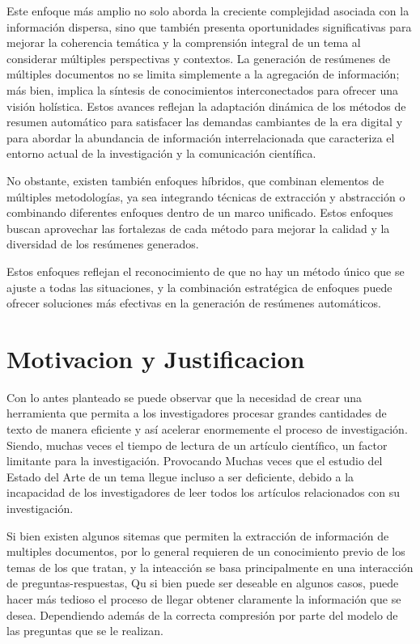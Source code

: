     Este enfoque más amplio no solo aborda la creciente complejidad asociada con la información dispersa, sino que también presenta oportunidades significativas para mejorar la coherencia temática y la comprensión integral de un tema al considerar múltiples perspectivas y contextos. La generación de resúmenes de múltiples documentos no se limita simplemente a la agregación de información; más bien, implica la síntesis de conocimientos interconectados para ofrecer una visión holística. Estos avances reflejan la adaptación dinámica de los métodos de resumen automático para satisfacer las demandas cambiantes de la era digital y para abordar la abundancia de información interrelacionada que caracteriza el entorno actual de la investigación y la comunicación científica.

    No obstante, existen también enfoques híbridos, que combinan elementos de múltiples metodologías, ya sea integrando técnicas de extracción y abstracción o combinando diferentes enfoques dentro de un marco unificado. Estos enfoques buscan aprovechar las fortalezas de cada método para mejorar la calidad y la diversidad de los resúmenes generados.
    
    Estos enfoques reflejan el reconocimiento de que no hay un método único que se ajuste a todas las situaciones, y la combinación estratégica de enfoques puede ofrecer soluciones más efectivas en la generación de resúmenes automáticos.



\section{Motivacion y Justificacion}

    Con lo antes planteado se puede observar que la necesidad de crear una herramienta que permita a los investigadores procesar grandes cantidades de texto de manera eficiente y así acelerar enormemente el proceso de investigación. Siendo, muchas veces el tiempo de lectura de un artículo científico, un factor limitante para la investigación. Provocando Muchas veces que el estudio del Estado del Arte de un tema llegue incluso a ser deficiente, debido a la incapacidad de los investigadores de leer todos los artículos relacionados con su investigación.

    Si bien existen algunos sitemas que permiten la extracción de información de multiples documentos, por lo general requieren de un conocimiento previo de los temas de los que tratan, y la inteacción se basa principalmente en una interacción de preguntas-respuestas, Qu si bien puede ser deseable en algunos casos, puede hacer más tedioso el proceso de llegar obtener claramente la información que se desea. Dependiendo además de la correcta compresión por parte del modelo de las preguntas que se le realizan.

